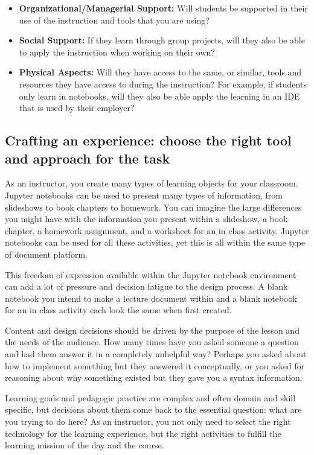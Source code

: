 \documentclass[]{book}
\providecommand{\tightlist}{%
  \setlength{\itemsep}{0pt}\setlength{\parskip}{0pt}}
\begin{document}
\begin{itemize}
\tightlist
\item
  \textbf{Organizational/Managerial Support:} Will students be supported
  in their use of the instruction and tools that you are using?
\item
  \textbf{Social Support:} If they learn through group projects, will
  they also be able to apply the instruction when working on their own?
\item
  \textbf{Physical Aspects:} Will they have access to the same, or
  similar, tools and resources they have access to during the
  instruction? For example, if students only learn in notebooks, will
  they also be able apply the learning in an IDE that is used by their
  employer?
\end{itemize}

\subsection{Crafting an experience: choose the right tool and approach
for the
task}\label{crafting-an-experience-choose-the-right-tool-and-approach-for-the-task}

As an instructor, you create many types of learning objects for your
classroom. Jupyter notebooks can be used to present many types of
information, from slideshows to book chapters to homework. You can
imagine the large differences you might have with the information you
present within a slideshow, a book chapter, a homework assignment, and a
worksheet for an in class activity. Jupyter notebooks can be used for
all these activities, yet this is all within the same type of document
platform.

This freedom of expression available within the Jupyter notebook
environment can add a lot of pressure and decision fatigue to the design
process. A blank notebook you intend to make a lecture document within
and a blank notebook for an in class activity each look the same when
first created.

Content and design decisions should be driven by the purpose of the
lesson and the needs of the audience. How many times have you asked
someone a question and had them answer it in a completely unhelpful way?
Perhaps you asked about how to implement something but they answered it
conceptually, or you asked for reasoning about why something existed but
they gave you a syntax information.

Learning goals and pedagogic practice are complex and often domain and
skill specific, but decisions about them come back to the essential
question: what are you trying to do here? As an instructor, you not only
need to select the right technology for the learning experience, but the
right activities to fulfill the learning mission of the day and the
course.
\end{document}
